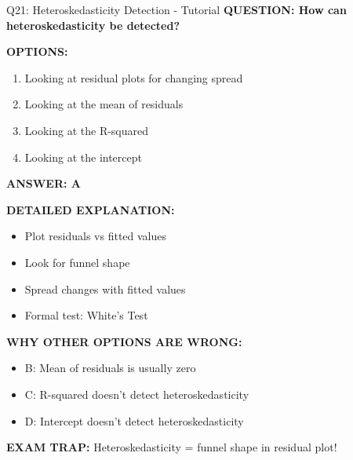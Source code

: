 \documentclass[8pt]{beamer}
\begin{document}
	\begin{frame}{Q21: Heteroskedasticity Detection - Tutorial}
		\fontsize{6.5}{7.5}\selectfont
		\textbf{QUESTION: How can heteroskedasticity be detected?}
		
		\vspace{0.1cm}
		\textbf{OPTIONS:}
		\begin{enumerate}
			\item Looking at residual plots for changing spread
			\item Looking at the mean of residuals
			\item Looking at the R-squared
			\item Looking at the intercept
		\end{enumerate}
		
		\vspace{0.1cm}
		\textcolor{myblue}{\textbf{ANSWER: A}}
		
		\vspace{0.1cm}
		\textbf{DETAILED EXPLANATION:}
		\begin{itemize}
			\item Plot residuals vs fitted values
			\item Look for funnel shape
			\item Spread changes with fitted values
			\item Formal test: White's Test
		\end{itemize}
		
		\vspace{0.1cm}
		\textcolor{myred}{\textbf{WHY OTHER OPTIONS ARE WRONG:}}
		\begin{itemize}
			\item \textcolor{myred}{B:} Mean of residuals is usually zero
			\item \textcolor{myred}{C:} R-squared doesn't detect heteroskedasticity
			\item \textcolor{myred}{D:} Intercept doesn't detect heteroskedasticity
		\end{itemize}
		
		\textcolor{myred}{\textbf{EXAM TRAP:}} Heteroskedasticity = \textcolor{myblue}{funnel shape in residual plot}!
	\end{frame}
	
\end{document}
